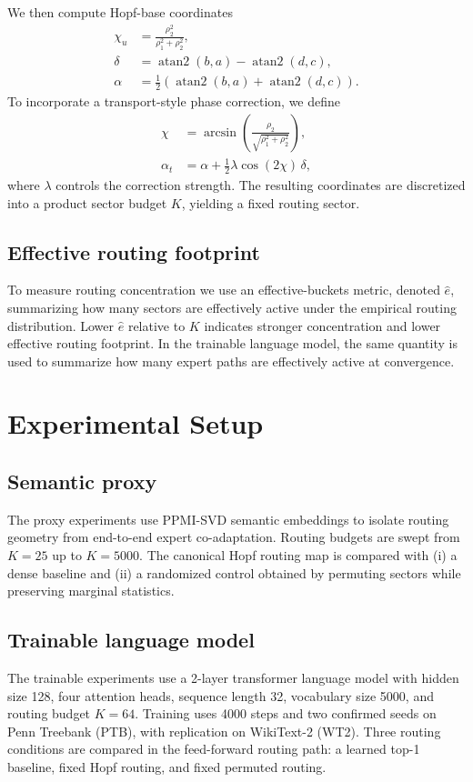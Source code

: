 \documentclass[10pt,conference]{IEEEtran}
\newcommand{\effb}{\hat e}
\begin{document}
We then compute Hopf-base coordinates
\begin{align}
\chi_u &= \frac{\rho_2^2}{\rho_1^2+\rho_2^2}, \\
\delta &= \operatorname{atan2}(b,a)-\operatorname{atan2}(d,c), \\
\alpha &= \tfrac{1}{2}\left(\operatorname{atan2}(b,a)+\operatorname{atan2}(d,c)\right).
\end{align}
To incorporate a transport-style phase correction, we define
\begin{align}
\chi &= \arcsin\!\left(\frac{\rho_2}{\sqrt{\rho_1^2+\rho_2^2}}\right), \\
\alpha_t &= \alpha + \tfrac{1}{2}\lambda \cos(2\chi)\,\delta,
\end{align}
where $\lambda$ controls the correction strength. The resulting coordinates are discretized into a product sector budget $K$, yielding a fixed routing sector.

\subsection{Effective routing footprint}
To measure routing concentration we use an effective-buckets metric, denoted $\effb$, summarizing how many sectors are effectively active under the empirical routing distribution. Lower $\effb$ relative to $K$ indicates stronger concentration and lower effective routing footprint. In the trainable language model, the same quantity is used to summarize how many expert paths are effectively active at convergence.

\section{Experimental Setup}
\subsection{Semantic proxy}
The proxy experiments use PPMI-SVD semantic embeddings to isolate routing geometry from end-to-end expert co-adaptation. Routing budgets are swept from $K=25$ up to $K=5000$. The canonical Hopf routing map is compared with (i) a dense baseline and (ii) a randomized control obtained by permuting sectors while preserving marginal statistics.

\subsection{Trainable language model}
The trainable experiments use a 2-layer transformer language model \citep{vaswani2017attention} with hidden size 128, four attention heads, sequence length 32, vocabulary size 5000, and routing budget $K=64$. Training uses 4000 steps and two confirmed seeds on Penn Treebank (PTB), with replication on WikiText-2 (WT2). Three routing conditions are compared in the feed-forward routing path: a learned top-1 baseline, fixed Hopf routing, and fixed permuted routing.
\end{document}

